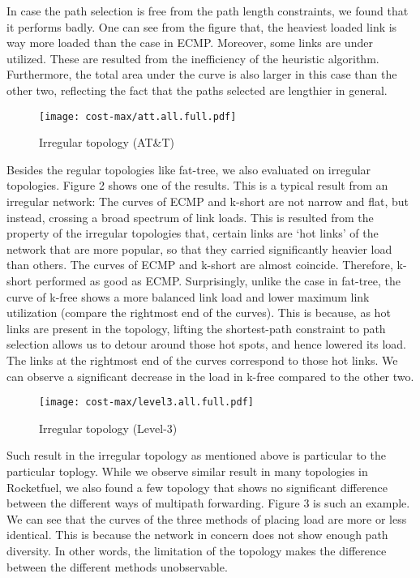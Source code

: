 \documentclass[conference]{IEEEtran}
\begin{document}
In case the path selection is free from the path length constraints, we found
that it performs badly. One can see from the figure that, the heaviest loaded
link is way more loaded than the case in ECMP. Moreover, some links are under
utilized. These are resulted from the inefficiency of the heuristic algorithm.
Furthermore, the total area under the curve is also larger in this case than
the other two, reflecting the fact that the paths selected are lengthier in
general.

\begin{figure}
\centering\texttt{[image: cost-max/att.all.full.pdf]}
\caption{Irregular topology (AT\&T)}
\end{figure}

Besides the regular topologies like fat-tree, we also evaluated on irregular
topologies. Figure 2 shows one of the results. This is a typical result from an
irregular network: The curves of ECMP and k-short are not narrow and flat, but
instead, crossing a broad spectrum of link loads. This is resulted from the
property of the irregular topologies that, certain links are `hot links' of the
network that are more popular, so that they carried significantly heavier load
than others. The curves of ECMP and k-short are almost coincide. Therefore,
k-short performed as good as ECMP. Surprisingly, unlike the case in fat-tree,
the curve of k-free shows a more balanced link load and lower maximum link
utilization (compare the rightmost end of the curves). This is because, as hot
links are present in the topology, lifting the shortest-path constraint to path
selection allows us to detour around those hot spots, and hence lowered its
load. The links at the rightmost end of the curves correspond to those hot
links. We can observe a significant decrease in the load in k-free compared to
the other two.

\begin{figure}
\centering\texttt{[image: cost-max/level3.all.full.pdf]}
\caption{Irregular topology (Level-3)}
\end{figure}

Such result in the irregular topology as mentioned above is particular to the
particular toplogy. While we observe similar result in many topologies in
Rocketfuel, we also found a few topology that shows no significant difference
between the different ways of multipath forwarding. Figure 3 is such an
example. We can see that the curves of the three methods of placing load are
more or less identical. This is because the network in concern does not show
enough path diversity. In other words, the limitation of the topology makes the
difference between the different methods unobservable.
\end{document}
